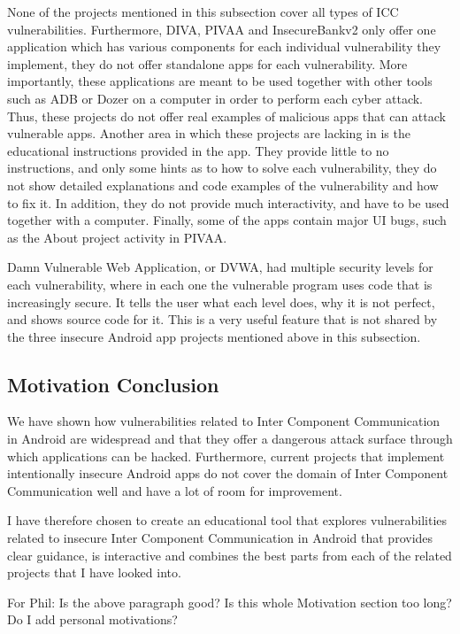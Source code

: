 		None of the projects mentioned in this subsection cover all types of ICC vulnerabilities. Furthermore, DIVA, PIVAA and InsecureBankv2 only offer one application which has various components for each individual vulnerability they implement, they do not offer standalone apps for each vulnerability. More importantly, these applications are meant to be used together with other tools such as ADB or Dozer on a computer in order to perform each cyber attack. Thus, these projects do not offer real examples of malicious apps that can attack vulnerable apps. Another area in which these projects are lacking in is the educational instructions provided in the app. They provide little to no instructions, and only some hints as to how to solve each vulnerability, they do not show detailed explanations and code examples of the vulnerability and how to fix it. In addition, they do not provide much interactivity, and have to be used together with a computer. Finally, some of the apps contain major UI bugs, such as the About project activity in PIVAA.
		
		Damn Vulnerable Web Application, or DVWA, had multiple security levels for each vulnerability, where in each one the vulnerable program uses code that is increasingly secure. It tells the user what each level does, why it is not perfect, and shows source code for it. This is a very useful feature that is not shared by the three insecure Android app projects mentioned above in this subsection.
		
		\subsection{Motivation Conclusion}
		
		We have shown how vulnerabilities related to Inter Component Communication in Android are widespread and that they offer a dangerous attack surface through which applications can be hacked. Furthermore, current projects that implement intentionally insecure Android apps do not cover the domain of Inter Component Communication well and have a lot of room for improvement. 
		
		I have therefore chosen to create an educational tool that explores vulnerabilities related to insecure Inter Component Communication in Android that provides clear guidance, is interactive and combines the best parts from each of the related projects that I have looked into.
		
		For Phil: Is the above paragraph good? Is this whole Motivation section too long? Do I add personal motivations?
		
